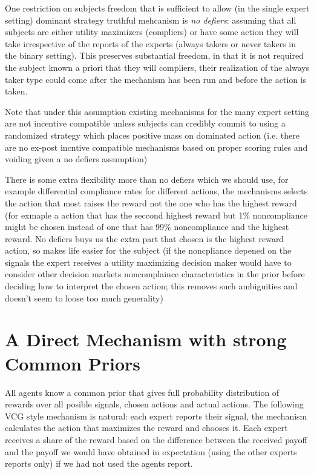 One restriction on subjects freedom that is sufficient to allow (in the single expert setting) dominant strategy truthful mehcanism is \emph{no defiers}: assuming that all subjects are either utility maximizers (compliers) or have some action they will take irrespective of the reports of the experts (always takers or never takers in the binary setting).
This preserves substantial freedom, in that it is not required the subject known a priori that they will compliers, their realization of the always taker type could come after the mechanism has been run and before the action is taken. 

Note that under this assumption existing mechanisms for the many expert setting are not incentive compatible unless subjects can credibly commit to using a randomized strategy which places positive mass on dominated action (i.e. there are no ex-post incntive compatible mechanisms based on proper scoring rules and voiding given a no defiers assumption)


There is some extra flexibility more than no defiers which we should use, for example differential compliance rates for different actions, the mechanisms selects the action that most raises the reward not the one who has the highest reward (for exmaple a action that has the seccond highest reward but 1\% noncompliance might be chosen instead of one  that has 99\% noncompliance and the highest reward. No defiers buys us the extra part that chosen is the highest reward action, so makes life easier for the subject (if the noncpliance depened on the signals the expert receives a utility maximizing decision maker would have to consider other decision markets noncomplaince characteristics in the prior before deciding how to interpret the chosen action; this removes such ambiguities and doesn't seem to loose too much generality)


\section{A Direct Mechanism with strong Common Priors}

All agents know a common prior that gives full probability distribution of rewards over all posible signals, chosen actions and actual actions. 
The following VCG style mechanism is natural: each expert reports their signal, the mechanism calculates the action that maximizes the reward and chooses it. Each expert receives a share of the reward based on the difference between the received payoff and the payoff we would have obtained in expectation (using the other experts reports only) if we had not used the agents report.

